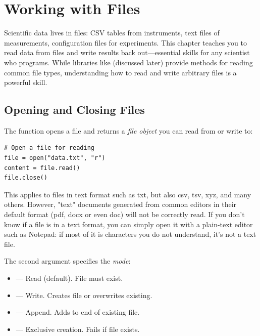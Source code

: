 
\chapter{Working with Files}
\label{chap:files}

Scientific data lives in files: CSV tables from instruments, text files of measurements, configuration files for experiments. This chapter teaches you to read data from files and write results back out---essential skills for any scientist who programs. While libraries like  (discussed later) provide methods for reading common file types, understanding how to read and write arbitrary files is a powerful skill.

\section{Opening and Closing Files}
\label{sec:opening-files}

The  function opens a file and returns a \emph{file object} you can read from or write to:

\begin{lstlisting}
# Open a file for reading
file = open("data.txt", "r")
content = file.read()
file.close()
\end{lstlisting}

This applies to files in text format such as txt, but also csv, tsv, xyz, and many others. However, "text" documents generated from common editors in their default format (pdf, docx or even doc) will not be correctly read. If you don't know if a file is in a text format, you can simply open it with a plain-text editor such as Notepad: if most of it is characters you do not understand, it's not a text file.

The second argument specifies the \emph{mode}:
\begin{itemize}
    \item {} --- Read (default). File must exist.
    \item {} --- Write. Creates file or overwrites existing.
    \item {} --- Append. Adds to end of existing file.
    \item {} --- Exclusive creation. Fails if file exists.
\end{itemize}

